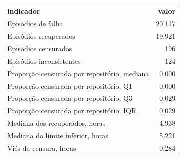\begin{tabular}{lr}
\hline
indicador & valor \\
\hline
Episódios de falha & 20.117 \\
Episódios recuperados & 19.921 \\
Episódios censurados & 196 \\
Episódios inconsistentes & 124 \\
Proporção censurada por repositório, mediana & 0,000 \\
Proporção censurada por repositório, Q1 & 0,000 \\
Proporção censurada por repositório, Q3 & 0,029 \\
Proporção censurada por repositório, IQR & 0,029 \\
Mediana dos recuperados, horas & 4,938 \\
Mediana do limite inferior, horas & 5,221 \\
Viés da censura, horas & 0,284 \\
\hline
\end{tabular}
